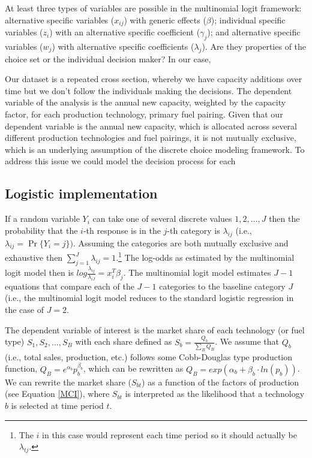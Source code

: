 \documentclass[10pt]{amsart}
\begin{document}
At least three types of variables are possible in the multinomial logit framework: alternative specific variables ($x_{ij}$) with generic effects ($\beta$); individual specific variables ($z_i$) with an alternative specific coefficient ($\gamma_j$); and alternative specific variables ($w_j$) with alternative specific coefficients ($\lambda_j$)\parencite{mlogit2013}.  
Are they properties of the choice set or the individual decision maker?
In our case, 

Our dataset is a repeated cross section, whereby we have capacity additions over time but we don't follow the individuals making the decisions. 
The dependent variable of the analysis is the annual new capacity, weighted by the capacity factor, for each production technology, primary fuel pairing. 
Given that our dependent variable is the annual new capacity, which is allocated across several different production technologies and fuel pairings, it is not mutually exclusive, which is an underlying assumption of the discrete choice modeling framework.
To address this issue we could model the decision process for each 

\subsection{Logistic implementation}
If a random variable $Y_{i}$ can take one of several discrete values $1, 2, \ldots, J$ then the probability that the $i$-th response is in the $j$-th category is $\lambda_{ij}$ (i.e., $\lambda_{ij} = \Pr\{Y_{i} = j\})$. 
Assuming the categories are both mutually exclusive and exhaustive then $\sum_{j=1}^J \lambda_{ij} = 1$.\footnote{The $i$ in this case would represent each time period so it should actually be $\lambda_{tj}$.} 
The log-odds as estimated by the multinomial logit model then is $log \frac{\lambda_{ij}}{\lambda_{iJ}} = x_{i}^T \beta_j$.
The multinomial logit model estimates $J - 1$ equations that compare each of the $J - 1$ categories to the baseline category $J$ (i.e., the multinomial logit model reduces to the standard logistic regression in the case of $J=2$. 

The dependent variable of interest is the market share of each technology (or fuel type) \textit{$S_1, S_2, \ldots, S_B$} with each share defined as $S_b = \frac{Q_b}{\sum_B Q_B}$.
We assume that $Q_b$ (i.e., total sales, production, etc.) follows some Cobb-Douglas type production function, $Q_B = e^{\alpha_b}p_{b}^{\beta_b}$, which can be rewritten as $Q_B = exp\left(\alpha_b + \beta_b \cdot ln(p_b)\right)$.
We can rewrite the market share ($S_{bt}$) as a function of the factors of production (see Equation \ref{MCI}), where $S_{bt}$ is interpreted as the likelihood that a technology $b$ is selected at time period $t$.  
\end{document}
